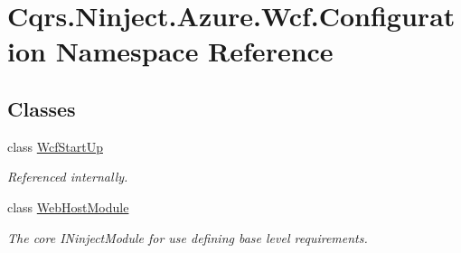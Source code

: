 \hypertarget{namespaceCqrs_1_1Ninject_1_1Azure_1_1Wcf_1_1Configuration}{}\section{Cqrs.\+Ninject.\+Azure.\+Wcf.\+Configuration Namespace Reference}
\label{namespaceCqrs_1_1Ninject_1_1Azure_1_1Wcf_1_1Configuration}
\subsection*{Classes}
\begin{DoxyCompactItemize}
\item 
class \hyperlink{classCqrs_1_1Ninject_1_1Azure_1_1Wcf_1_1Configuration_1_1WcfStartUp}{Wcf\+Start\+Up}
\begin{DoxyCompactList}\small\item\em Referenced internally. \end{DoxyCompactList}\item 
class \hyperlink{classCqrs_1_1Ninject_1_1Azure_1_1Wcf_1_1Configuration_1_1WebHostModule}{Web\+Host\+Module}
\begin{DoxyCompactList}\small\item\em The core I\+Ninject\+Module for use defining base level requirements. \end{DoxyCompactList}\end{DoxyCompactItemize}
